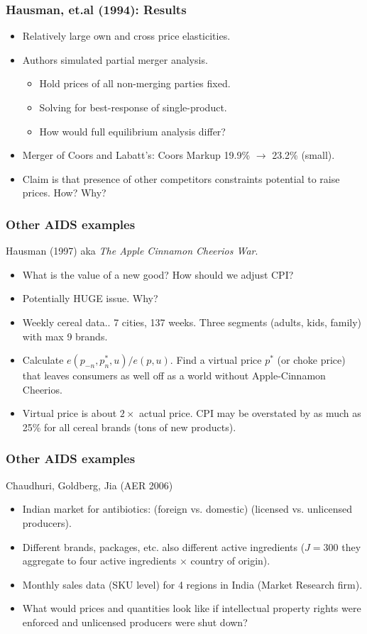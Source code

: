 \documentclass[xcolor=pdftex,dvipsnames,table,mathserif,aspectratio=169]{beamer}
\begin{document}
\begin{frame}
\frametitle{Hausman, et.al (1994): Results}
\begin{itemize}
\item Relatively large own and cross price elasticities.
\item Authors simulated \alert{partial merger analysis}.
\begin{itemize}
\item Hold prices of all non-merging parties fixed.
\item Solving for best-response of single-product.
\item How would full equilibrium analysis differ?
\end{itemize}
\item  Merger of Coors and Labatt's: Coors Markup 19.9\% $\rightarrow$ 23.2\% (small).
\item Claim is that presence of other competitors constraints potential to raise prices. How? Why?
\end{itemize}
\end{frame} 

\begin{frame}
\frametitle{Other AIDS examples}
 Hausman (1997) aka \textit{The Apple Cinnamon Cheerios War}.
\begin{itemize}
\item What is the value of a new good? How should we adjust CPI?
\item Potentially HUGE issue. Why? 
\item Weekly cereal data.. 7 cities, 137 weeks. Three segments (adults, kids, family) with max 9 brands.
\item Calculate $e(p_{-n},p_n^*,u) / e(p,u)$. Find a \alert{virtual price} $p^{*}$ (or choke price) that leaves consumers as well off as a world without Apple-Cinnamon Cheerios.
\item Virtual price is about $2 \times$ actual price. CPI may be overstated by as much as 25\% for all cereal brands (tons of new products).
\end{itemize}
\end{frame} 

\begin{frame}
\frametitle{Other AIDS examples}
 Chaudhuri, Goldberg, Jia (AER 2006)
\begin{itemize}
\item Indian market for antibiotics: (foreign vs. domestic) (licensed vs. unlicensed producers).
\item Different brands, packages, etc. also different active ingredients ($J=300$ they aggregate to four active ingredients $\times$ country of origin).
\item Monthly sales data (SKU level) for 4 regions in India (Market Research firm).
\item What would prices and quantities look like if intellectual property rights were enforced and unlicensed producers were shut down?
\end{itemize}
\end{frame} 
\end{document}
